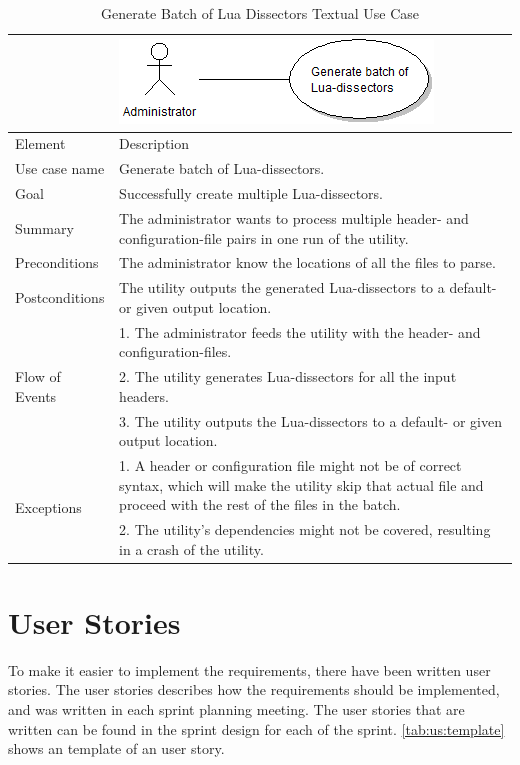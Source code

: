 \begin{table}[htbp] \footnotesize \center
\caption{Generate Batch of Lua Dissectors Textual Use Case\label{tab:textual:luabatch}}
\begin{tabularx}{\textwidth}{l X}
	 & \includegraphics[scale=0.8]{./planning/img/uc_luabatch} \\
	\toprule
	Element & Description\\
	\midrule
	Use case name & Generate batch of Lua-dissectors.\\
	Goal & Successfully create multiple Lua-dissectors. \\
	Summary & The administrator wants to process multiple header- and configuration-file pairs in one run of the utility. \\
	Preconditions & The administrator know the locations of all the files to parse. \\
	Postconditions & The utility outputs the generated Lua-dissectors to a default- or given output location.\\
	\midrule
	\multirow{3}{*}{Flow of Events} &  1. The administrator feeds the utility with the header- and configuration-files.\\
	& 2. The utility generates Lua-dissectors for all the input headers.	\\
	& 3. The utility outputs the Lua-dissectors to a default- or given output location.	\\
	\midrule
	\multirow{2}{*}{Exceptions} & 1. A header or configuration file might not be of correct syntax, which will make the utility skip that actual file and proceed with the rest of the files in the batch.\\
	& 2. The utility's dependencies might not be covered, resulting in a crash of the utility.\\
	\bottomrule
\end{tabularx}
\end{table}

\section{User Stories}
To make it easier to implement the requirements, there have been written user stories. The user stories describes how the requirements should be implemented, and was written in each sprint planning meeting. The user stories that are written can be found in the sprint design for each of the sprint. \autoref{tab:us:template} shows an template of an user story.

